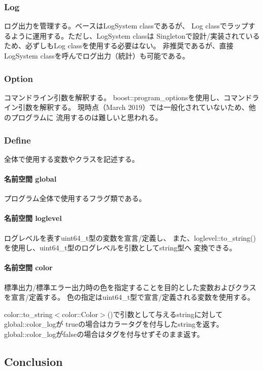 \subsubsection*{Log}

ログ出力を管理する。ベースは\+Log\+System classであるが、 Log classでラップするように運用する。ただし、\+Log\+System classは Singletonで設計/実装されているため、必ずしも\+Log classを使用する必要はない。 非推奨であるが、直接\+Log\+System classを呼んでログ出力（統計）も可能である。

\subsubsection*{Option}

コマンドライン引数を解釈する。 boost\+::program\+\_\+optionsを使用し、コマンドライン引数を解釈する。 現時点（\+March 2019）では一般化されていないため、他のプログラムに 流用するのは難しいと思われる。

\subsubsection*{Define}

全体で使用する変数やクラスを記述する。

\paragraph*{名前空間 global}

プログラム全体で使用するフラグ類である。

\paragraph*{名前空間 loglevel}

ログレベルを表すuint64\+\_\+t型の変数を宣言/定義し、 また、loglevel\+::to\+\_\+string()を使用し、uint64\+\_\+t型のログレベルを引数としてstring型へ 変換できる。

\paragraph*{名前空間 color}

標準出力/標準エラー出力時の色を指定することを目的とした変数およびクラスを宣言/定義する。 色の指定はuint64\+\_\+t型で宣言/定義される変数を使用する。

color\+::to\+\_\+string$<$color\+::\+Color$>$()で引数として与えるstringに対してglobal\+::color\+\_\+logが trueの場合はカラータグを付与したstringを返す。 global\+::color\+\_\+logがfalseの場合はタグを付与せずそのまま返す。 \subsection*{Conclusion}

